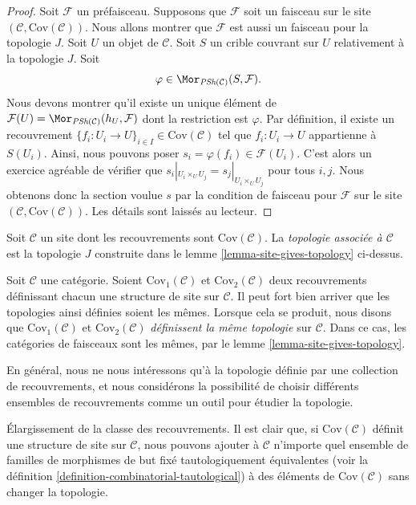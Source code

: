 \begin{proof}
\medskip\noindent
Soit $\mathcal{F}$ un préfaisceau. Supposons que $\mathcal{F}$
soit un faisceau sur le site $(\mathcal{C}, \text{Cov}(\mathcal{C}))$.
Nous allons montrer que $\mathcal{F}$ est aussi un faisceau pour la topologie $J$.
Soit $U$ un objet de $\mathcal{C}$. Soit
$S$ un crible couvrant sur $U$ relativement à la topologie $J$.
Soit
$$
\varphi \in \Mor_{\textit{PSh}(\mathcal{C})}(S, \mathcal{F}).
$$
Nous devons montrer qu'il existe un unique élément de
$\mathcal{F}(U) = \Mor_{\textit{PSh}(\mathcal{C})}(h_U, \mathcal{F})$
dont la restriction est $\varphi$. Par définition, il existe
un recouvrement $\{f_i : U_i \to U\}_{i\in I} \in \text{Cov}(\mathcal{C})$
tel que $f_i : U_i \to U$ appartienne à $S(U_i)$. Ainsi,
nous pouvons poser $s_i = \varphi(f_i) \in \mathcal{F}(U_i)$.
C'est alors un exercice agréable de vérifier que
$s_i|_{U_i \times_U U_j} = s_j|_{U_i \times_U U_j}$ pour tous
$i, j$. Nous obtenons donc la section voulue $s$ par la condition de
faisceau pour $\mathcal{F}$ sur le site
$(\mathcal{C}, \text{Cov}(\mathcal{C}))$.
Les détails sont laissés au lecteur.
\end{proof}

\begin{definition}
\label{definition-topology-associated-site}
Soit $\mathcal{C}$ un site dont les recouvrements sont $\text{Cov}(\mathcal{C})$.
La {\it topologie associée à $\mathcal{C}$} est la topologie
$J$ construite dans le lemme \ref{lemma-site-gives-topology} ci-dessus.
\end{definition}

\noindent
Soit $\mathcal{C}$ une catégorie.
Soient $\text{Cov}_1(\mathcal{C})$ et $\text{Cov}_2(\mathcal{C})$
deux recouvrements définissant chacun une structure de site sur $\mathcal{C}$.
Il peut fort bien arriver que les topologies ainsi définies
soient les mêmes. Lorsque cela se produit,
nous disons que $\text{Cov}_1(\mathcal{C})$ et
$\text{Cov}_2(\mathcal{C})$ {\it définissent la même topologie} sur
$\mathcal{C}$. Dans ce cas, les catégories de faisceaux
sont les mêmes, par le lemme \ref{lemma-site-gives-topology}.

\medskip\noindent
En général, nous ne nous intéressons qu'à la topologie définie
par une collection de recouvrements, et nous considérons la possibilité de choisir
différents ensembles de recouvrements comme un outil pour étudier la topologie.

\begin{remark}
\label{remark-enlarge-coverings}
Élargissement de la classe des recouvrements.
Il est clair que, si $\text{Cov}(\mathcal{C})$
définit une structure de site sur $\mathcal{C}$, nous pouvons
ajouter à $\mathcal{C}$ n'importe quel ensemble de familles de morphismes de but fixé
tautologiquement équivalentes
(voir la définition \ref{definition-combinatorial-tautological})
à des éléments de $\text{Cov}(\mathcal{C})$ sans changer la topologie.
\end{remark}

